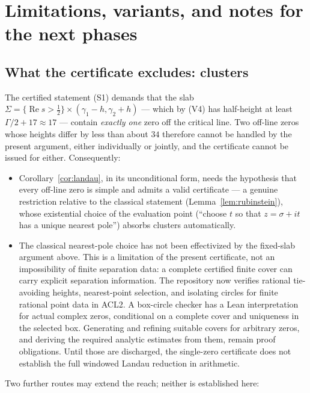 \documentclass[11pt]{amsart}
\numberwithin{equation}{section}
\newcommand{\re}{\operatorname{Re}}
\newcommand{\Sig}{\sigma}
\begin{document}
\section{Limitations, variants, and notes for the next phases}\label{sec:limits}

\subsection{What the certificate excludes: clusters}\label{sec:clusters}

The certified statement (S1) demands that the slab
$\Sigma = \{\re s > \tfrac12\} \times (\gamma_1 - h, \gamma_2 + h)$
--- which by (V4) has half-height at least $\Gamma/2 + 17 \approx 17$
--- contain \emph{exactly one} zero off the critical line. Two off-line
zeros whose heights differ by less than about $34$ therefore cannot be
handled by the present argument, either individually or jointly, and
the certificate cannot be issued for either. Consequently:

\begin{itemize}
\item Corollary~\ref{cor:landau}, in its unconditional form, needs the
hypothesis that every off-line zero is simple and admits a valid
certificate --- a genuine restriction relative to the classical
statement (Lemma~\ref{lem:rubinstein}), whose existential choice of the
evaluation point (``choose $t$ so that $z = \Sig + it$ has a unique
nearest pole'') absorbs clusters automatically.
\item The classical nearest-pole choice has not been effectivized by
the fixed-slab argument above. This is a limitation of the present
certificate, not an impossibility of finite separation data: a complete
certified finite cover can carry explicit separation information.
The repository now verifies rational tie-avoiding heights, nearest-point
selection, and isolating circles for finite rational point data in ACL2.
A box-circle checker has a Lean interpretation for actual complex zeros,
conditional on a complete cover and uniqueness in the selected box.
Generating and refining suitable covers for arbitrary zeros, and
deriving the required analytic estimates from them, remain proof
obligations. Until those are discharged, the single-zero certificate
does not establish the full windowed Landau reduction in arithmetic.
\end{itemize}

Two further routes may extend the reach; neither is established here:
\end{document}

